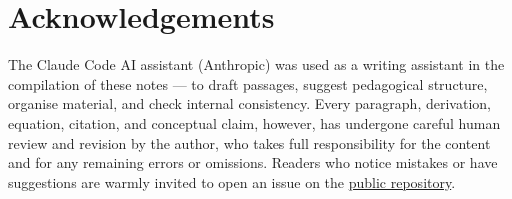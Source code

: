 \chapter*{Acknowledgements}

The Claude Code AI assistant (Anthropic) was used as a writing
assistant in the compilation of these notes --- to draft passages,
suggest pedagogical structure, organise material, and check
internal consistency. Every paragraph, derivation, equation,
citation, and conceptual claim, however, has undergone careful
human review and revision by the author, who takes full
responsibility for the content and for any remaining errors or
omissions. Readers who notice mistakes or have suggestions are
warmly invited to open an issue on the
\href{https://github.com/fewagner/quantum101}{public repository}.
